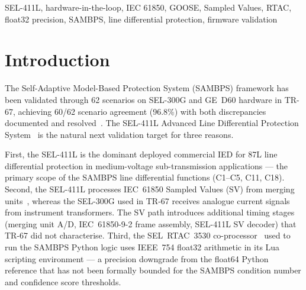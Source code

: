 \documentclass[journal,twoside]{IEEEtran}
\begin{document}
\begin{IEEEkeywords}
SEL-411L, hardware-in-the-loop, IEC 61850, GOOSE, Sampled Values, RTAC,
float32 precision, SAMBPS, line differential protection, firmware validation
\end{IEEEkeywords}

\section{Introduction}
\label{sec:intro}

The Self-Adaptive Model-Based Protection System (SAMBPS) framework has been
validated through 62 scenarios on SEL-300G and GE~D60 hardware in TR-67,
achieving 60/62 scenario agreement (96.8\%) with both discrepancies documented
and resolved~\cite{SAMBP_TR67}.
The SEL-411L Advanced Line Differential Protection System~\cite{SEL411L} is the
natural next validation target for three reasons.

First, the SEL-411L is the dominant deployed commercial IED for 87L line
differential protection in medium-voltage sub-transmission applications
--- the primary scope of the SAMBPS line differential functions (C1--C5,
C11, C18).
Second, the SEL-411L processes IEC~61850 Sampled Values (SV) from merging
units~\cite{IEC61869}, whereas the SEL-300G used in TR-67 receives analogue
current signals from instrument transformers.
The SV path introduces additional timing stages (merging unit A/D,
IEC~61850-9-2 frame assembly, SEL-411L SV decoder) that TR-67 did not
characterise.
Third, the SEL~RTAC~3530 co-processor~\cite{SELRTAC3530} used to run the
SAMBPS Python logic uses IEEE~754 float32 arithmetic in its Lua scripting
environment --- a precision downgrade from the float64 Python reference that
has not been formally bounded for the SAMBPS condition number and confidence
score thresholds.
\end{document}
